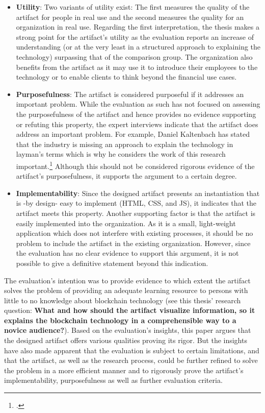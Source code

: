\begin{itemize}
    \item \textbf{Utility}: Two variants of utility exist: The first measures the quality of the artifact for people in real use and the second measures the quality for an organization in real use. Regarding the first interpretation, the thesis makes a strong point for the artifact's utility as the evaluation reports an increase of understanding (or at the very least in a structured approach to explaining the technology) surpassing that of the comparison group. The organization also benefits from the artifact as it may use it to introduce their employees to the technology or to enable clients to think beyond the financial use cases.
    \item \textbf{Purposefulness}: The artifact is considered purposeful if it addresses an important problem. While the evaluation as such has not focused on assessing the purposefulness of the artifact and hence provides no evidence supporting or refuting this property, the expert interviews indicate that the artifact does address an important problem. For example, Daniel Kaltenbach has stated that the industry is missing an approach to explain the technology in layman's terms which is why he considers the work of this research important.\footcites[Cf.][]{DanielKaltenbach_Interview} Although this should not be considered rigorous evidence of the artifact's purposefulness, it supports the argument to a certain degree.
    \item \textbf{Implementability}: Since the designed artifact presents an instantiation that is -by design- easy to implement (HTML, CSS, and JS), it indicates that the artifact meets this property. Another supporting factor is that the artifact is easily implemented into the organization. As it is a small, light-weight application which does not interfere with existing processes, it should be no problem to include the artifact in the existing organization. However, since the evaluation has no clear evidence to support this argument, it is not possible to give a definitive statement beyond this indication.
\end{itemize}

The evaluation's intention was to provide evidence to which extent the artifact solves the problem of providing an adequate learning resource to persons with little to no knowledge about blockchain technology (see this thesis' research question: \textbf{What and how should the artifact visualize information, so it explains the blockchain technology in a comprehensible way to a novice audience?}).
Based on the evaluation's insights, this paper argues that the designed artifact offers various qualities proving its rigor. But the insights have also made apparent that the evaluation is subject to certain limitations, and that the artifact, as well as the research process, could be further refined to solve the problem in a more efficient manner and to rigorously prove the artifact's implementability, purposefulness as well as further evaluation criteria. 


